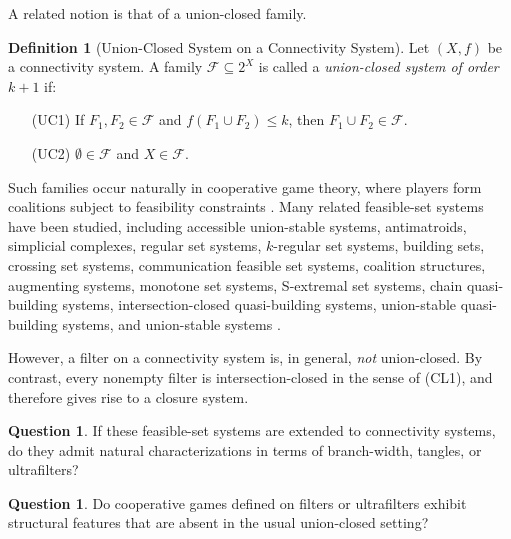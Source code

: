 \documentclass[10pt]{book}
\theoremstyle{definition}
\newtheorem{definition}[theorem]{Definition}
\newtheorem{question}[theorem]{Question}
\begin{document}
A related notion is that of a union-closed family.

\begin{definition}[Union-Closed System on a Connectivity System]
Let \((X,f)\) be a connectivity system.  
A family \(\mathcal{F}\subseteq 2^X\) is called a \emph{union-closed system of order \(k+1\)} if:
\begin{enumerate}
    \item[(UC1)] If \(F_1,F_2\in \mathcal{F}\) and \(f(F_1\cup F_2)\leq k\), then \(F_1\cup F_2\in \mathcal{F}\).
    \item[(UC2)] \(\emptyset\in \mathcal{F}\) and \(X\in \mathcal{F}\).
\end{enumerate}
\end{definition}

Such families occur naturally in cooperative game theory, where players form coalitions subject to feasibility constraints \cite{aumann1964bargaining,peleg2007introduction,nash1953two,lozano2013cooperative,nash1950non}.  
Many related feasible-set systems have been studied, including accessible union-stable systems, antimatroids, simplicial complexes, regular set systems, \(k\)-regular set systems, building sets, crossing set systems, communication feasible set systems, coalition structures, augmenting systems, monotone set systems, S-extremal set systems, chain quasi-building systems, intersection-closed quasi-building systems, union-stable quasi-building systems, and union-stable systems \cite{algaba2013cooperative,algaba2003axiomatizations,algaba2004axiomatization,pruesse1993gray,gutin2002anti,dietrich1989matroids,martino2021cooperative,Lange2009ValuesOR,Xie2009TheCO,Koshevoy2011SolutionCF,Karzanov1996HowTT,Proefschrift2015HierarchiesCA,ZouSolutionsFC,Bilbao2003CooperativeGU,Kaplan1999OnlineCO,Mszros2010SextremalSS,Suzuki2015SolutionsFC,algaba2000position,algaba2015harsanyi}.

However, a filter on a connectivity system is, in general, \emph{not} union-closed.  
By contrast, every nonempty filter is intersection-closed in the sense of (CL1), and therefore gives rise to a closure system.

\begin{question}
If these feasible-set systems are extended to connectivity systems, do they admit natural characterizations in terms of branch-width, tangles, or ultrafilters?
\end{question}

\begin{question}
Do cooperative games defined on filters or ultrafilters exhibit structural features that are absent in the usual union-closed setting?
\end{question}
\end{document}
